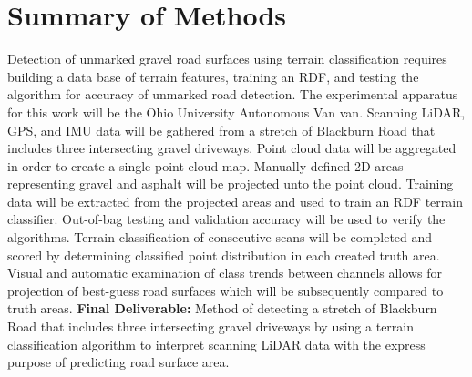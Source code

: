 \documentclass[numbered,pdftex]{ohio-etd}
\begin{document}
{	
	\section{Summary of Methods}\label{sec:summary-of-methods}{
		
		{Detection of unmarked gravel road surfaces using terrain classification requires building a data base of terrain features, training an RDF, and testing the algorithm for accuracy of unmarked road detection. The experimental apparatus for this work will be the Ohio University Autonomous Van van. Scanning LiDAR, GPS, and IMU data will be gathered from a stretch of Blackburn Road that includes three intersecting gravel driveways. Point cloud data will be aggregated in order to create a single point cloud map. Manually defined 2D areas representing gravel and asphalt will be projected unto the point cloud. Training data will be extracted from the projected areas and used to train an RDF terrain classifier. Out-of-bag testing and validation accuracy will be used to verify the algorithms. Terrain classification of consecutive scans will be completed and scored by determining classified point distribution in each created truth area. Visual and automatic examination of class trends between channels allows for projection of best-guess road surfaces which will be subsequently compared to truth areas. \textbf{Final Deliverable:} Method of detecting a stretch of Blackburn Road that includes three intersecting gravel driveways by using a terrain classification algorithm to interpret scanning LiDAR data with the express purpose of predicting road surface area.}
		
	} %
	
} %
\end{document}
